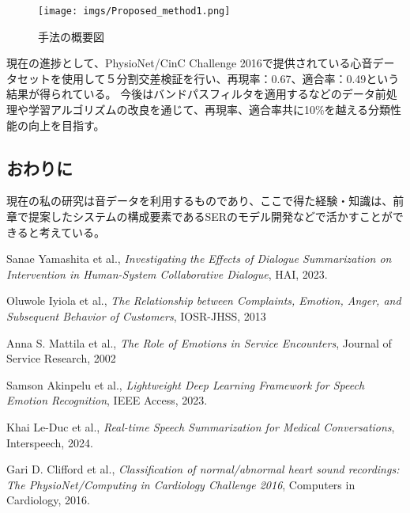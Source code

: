 \documentclass[a4j,10pt, twocolumn]{jarticle}
\begin{document}
\begin{figure}[H]
    \centering
    \texttt{[image: imgs/Proposed\_method1.png]}
    \caption{手法の概要図}
    \label{method overview1}
\end{figure}

現在の進捗として、PhysioNet/CinC Challenge 2016\cite{Dataset discription}で提供されている心音データセットを使用して５分割交差検証を行い、再現率：0.67、適合率：0.49という結果が得られている。
今後はバンドパスフィルタを適用するなどのデータ前処理や学習アルゴリズムの改良を通じて、再現率、適合率共に10\%を越える分類性能の向上を目指す。

\subsection{おわりに}
現在の私の研究は音データを利用するものであり、ここで得た経験・知識は、前章で提案したシステムの構成要素であるSERのモデル開発などで活かすことができると考えている。

\begingroup
\footnotesize
\begin{thebibliography}{6}
\setlength{\itemsep}{2pt}   %
\setlength{\parskip}{0pt}   %

Sanae Yamashita et al., \textit{Investigating the Effects of Dialogue Summarization on Intervention in Human-System Collaborative Dialogue}, HAI, 2023.

Oluwole Iyiola et al., \textit{The Relationship between Complaints, Emotion, Anger, and Subsequent Behavior of Customers}, IOSR-JHSS, 2013

Anna S. Mattila et al., \textit{The Role of Emotions in Service Encounters}, Journal of Service Research, 2002

Samson Akinpelu et al., \textit{Lightweight Deep Learning Framework for Speech Emotion Recognition}, IEEE Access, 2023.

Khai Le-Duc et al., \textit{Real-time Speech Summarization for Medical Conversations}, Interspeech, 2024.

Gari D. Clifford et al., \textit{Classification of normal/abnormal heart sound recordings: The PhysioNet/Computing in Cardiology Challenge 2016}, Computers in Cardiology, 2016.
\end{thebibliography}
\endgroup
\end{document}
